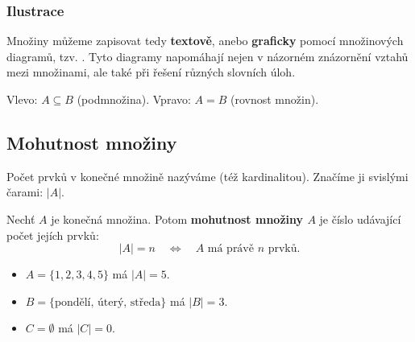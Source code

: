 \documentclass[12pt,a4paper]{article}
\begin{document}
\subsubsection*{Ilustrace}

Množiny můžeme zapisovat tedy \textbf{textově}, anebo \textbf{graficky} pomocí množinových diagramů, tzv. .  
Tyto diagramy napomáhají nejen v názorném znázornění vztahů mezi množinami, ale také při řešení různých slovních úloh.  

\begin{center}
\hspace{2.5cm}
\end{center}

\begin{center}
Vlevo: $A \subseteq B$ (podmnožina).  
Vpravo: $A = B$ (rovnost množin).
\end{center}

\subsection{Mohutnost množiny}

Počet prvků v konečné množině nazýváme  (též kardinalitou).  
Značíme ji svislými čarami: $|A|$.  

\begin{definitionbox}
Nechť $A$ je konečná množina. Potom \textbf{mohutnost množiny $A$} je číslo udávající počet jejích prvků:  
\[
|A| = n \quad \Leftrightarrow \quad A \text{ má právě $n$ prvků}.
\]
\end{definitionbox}

\begin{examplebox}
\begin{itemize}
    \item $A = \{1,2,3,4,5\}$ má $|A| = 5$.  
    \item $B = \{\text{pondělí, úterý, středa}\}$ má $|B| = 3$.  
    \item $C = \emptyset$ má $|C| = 0$.
\end{itemize}
\end{examplebox}
\end{document}
